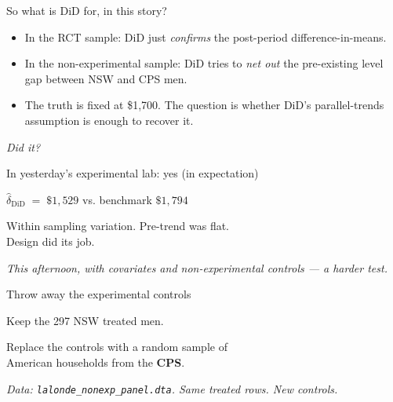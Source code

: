\documentclass[11pt,aspectratio=169]{beamer}
\begin{document}
\begin{frame}{So what is DiD for, in this story?}
\vspace{0.6em}
\begin{itemize}
  \item In the RCT sample: DiD just \textit{confirms} the post-period difference-in-means.
  \item In the non-experimental sample: DiD tries to \textit{net out} the pre-existing level gap between NSW and CPS men.
  \item The truth is fixed at \$1{,}700. \;The question is whether DiD's parallel-trends assumption is enough to recover it.
\end{itemize}
\vspace{0.6em}
\begin{center}
\large\itshape\color{charcoal}
Did it?
\end{center}
\end{frame}

\begin{frame}{In yesterday's experimental lab: yes (in expectation)}
\vspace{1em}
\begin{center}
\Large
$\widehat{\delta}_{\text{DiD}} \;=\; \$1{,}529$ \;\;vs.\;\; benchmark \;$\$1{,}794$
\end{center}
\vspace{0.8em}
\begin{center}
\large
Within sampling variation. \;Pre-trend was flat. \\[0.3em] Design did its job.
\end{center}
\vspace{1em}
\begin{center}
\small\color{warmgray}\itshape
This afternoon, with covariates and non-experimental controls --- a harder test.
\end{center}
\end{frame}


\begin{frame}{Throw away the experimental controls}
\vspace{1em}
\begin{center}
\large
Keep the 297 NSW treated men.
\end{center}
\vspace{0.6em}
\begin{center}
\large
Replace the controls with a random sample of \\[0.2em] American households from the \textbf{CPS}.
\end{center}
\vspace{1em}
\begin{center}
\small\color{warmgray}\itshape
Data: \texttt{lalonde\_nonexp\_panel.dta}. \;Same treated rows. \;New controls.
\end{center}
\end{frame}
\end{document}

